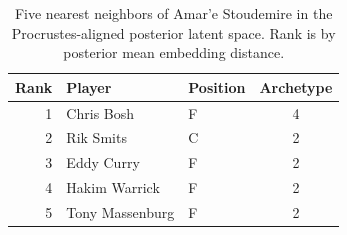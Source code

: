 \begin{table}[htbp]
  \centering\small
  \begin{tabular}{rllc}
    \toprule
    Rank & Player & Position & Archetype \\
    \midrule
    1 & Chris Bosh & F & 4 \\
    2 & Rik Smits & C & 2 \\
    3 & Eddy Curry & F & 2 \\
    4 & Hakim Warrick & F & 2 \\
    5 & Tony Massenburg & F & 2 \\
    \bottomrule
  \end{tabular}
  \caption{Five nearest neighbors of Amar'e Stoudemire in the Procrustes-aligned posterior latent space. Rank is by posterior mean embedding distance.}
  \label{tab:Amar_e_Stoudemire_neighbors}
\end{table}

